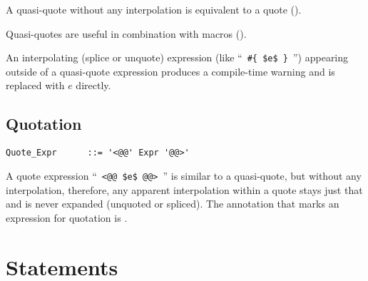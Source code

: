 A quasi-quote without any interpolation is equivalent to a quote (). 

Quasi-quotes are useful in combination with macros (). 

An interpolating (splice or unquote) expression (like ``~\lstinline!#{ $e$ }!~'') appearing outside of a quasi-quote expression produces a compile-time warning and is replaced with $e$ directly. 





\subsection{Quotation}
\label{sec:quotation}

\syntax\begin{lstlisting}
Quote_Expr      ::= '<@@' Expr '@@>'
\end{lstlisting}

A quote expression ``~\lstinline!<@@ $e$ @@>!~'' is similar to a quasi-quote, but without any interpolation, therefore, any apparent interpolation within a quote stays just that and is never expanded (unquoted or spliced). The annotation that marks an expression for quotation is . 





\section{Statements}
\label{sec:statements}

